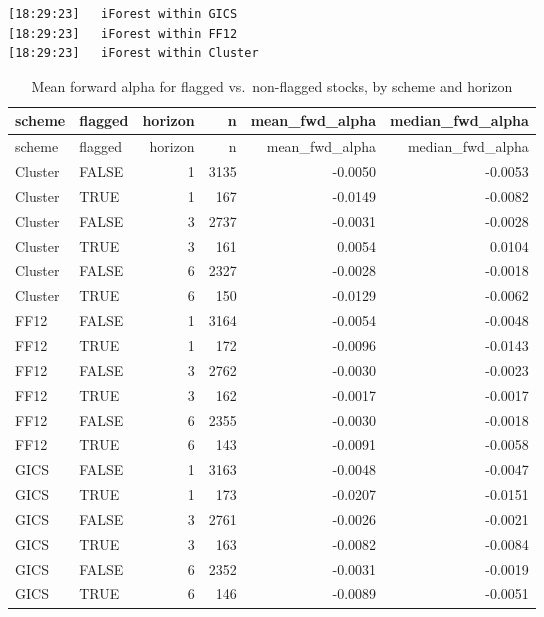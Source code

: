 \documentclass[
  letterpaper,
  DIV=11,
  numbers=noendperiod]{scrartcl}
\newenvironment{Shaded}{\begin{snugshade}}{\end{snugshade}}
\newcommand{\AttributeTok}[1]{\textcolor[rgb]{0.40,0.45,0.13}{#1}}
\newcommand{\DecValTok}[1]{\textcolor[rgb]{0.68,0.00,0.00}{#1}}
\newcommand{\FunctionTok}[1]{\textcolor[rgb]{0.28,0.35,0.67}{#1}}
\newcommand{\NormalTok}[1]{\textcolor[rgb]{0.00,0.23,0.31}{#1}}
\newcommand{\SpecialCharTok}[1]{\textcolor[rgb]{0.37,0.37,0.37}{#1}}
\newcommand{\StringTok}[1]{\textcolor[rgb]{0.13,0.47,0.30}{#1}}
\begin{document}
\begin{verbatim}
[18:29:23]   iForest within GICS
[18:29:23]   iForest within FF12
[18:29:23]   iForest within Cluster
\end{verbatim}

\begin{Shaded}
\end{Shaded}

\begin{longtable}[]{@{}llrrrr@{}}
\caption{Mean forward alpha for flagged vs.~non-flagged stocks, by
scheme and horizon}\tabularnewline
\toprule\noalign{}
scheme & flagged & horizon & n & mean\_fwd\_alpha &
median\_fwd\_alpha \\
\midrule\noalign{}
\endfirsthead
\toprule\noalign{}
scheme & flagged & horizon & n & mean\_fwd\_alpha &
median\_fwd\_alpha \\
\midrule\noalign{}
\endhead
\bottomrule\noalign{}
\endlastfoot
Cluster & FALSE & 1 & 3135 & -0.0050 & -0.0053 \\
Cluster & TRUE & 1 & 167 & -0.0149 & -0.0082 \\
Cluster & FALSE & 3 & 2737 & -0.0031 & -0.0028 \\
Cluster & TRUE & 3 & 161 & 0.0054 & 0.0104 \\
Cluster & FALSE & 6 & 2327 & -0.0028 & -0.0018 \\
Cluster & TRUE & 6 & 150 & -0.0129 & -0.0062 \\
FF12 & FALSE & 1 & 3164 & -0.0054 & -0.0048 \\
FF12 & TRUE & 1 & 172 & -0.0096 & -0.0143 \\
FF12 & FALSE & 3 & 2762 & -0.0030 & -0.0023 \\
FF12 & TRUE & 3 & 162 & -0.0017 & -0.0017 \\
FF12 & FALSE & 6 & 2355 & -0.0030 & -0.0018 \\
FF12 & TRUE & 6 & 143 & -0.0091 & -0.0058 \\
GICS & FALSE & 1 & 3163 & -0.0048 & -0.0047 \\
GICS & TRUE & 1 & 173 & -0.0207 & -0.0151 \\
GICS & FALSE & 3 & 2761 & -0.0026 & -0.0021 \\
GICS & TRUE & 3 & 163 & -0.0082 & -0.0084 \\
GICS & FALSE & 6 & 2352 & -0.0031 & -0.0019 \\
GICS & TRUE & 6 & 146 & -0.0089 & -0.0051 \\
\end{longtable}
\end{document}
